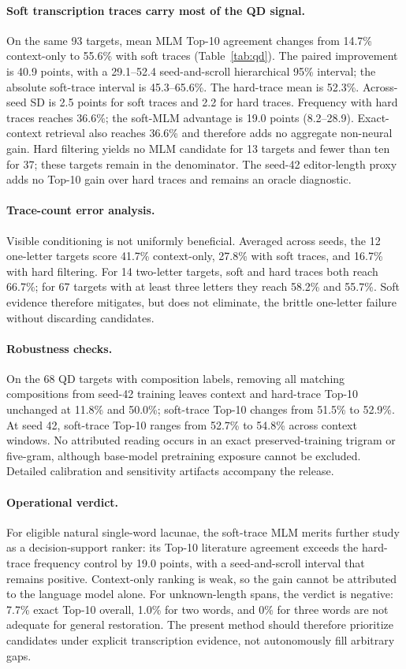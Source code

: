 \documentclass[10pt,twocolumn,a4paper]{article}
\begin{document}
\paragraph{Soft transcription traces carry most of the QD signal.}
On the same 93 targets, mean MLM Top-10 agreement changes from 14.7\% context-only to 55.6\% with soft traces (Table~\ref{tab:qd}). The paired improvement is 40.9 points, with a 29.1--52.4 seed-and-scroll hierarchical 95\% interval; the absolute soft-trace interval is 45.3--65.6\%. The hard-trace mean is 52.3\%. Across-seed SD is 2.5 points for soft traces and 2.2 for hard traces. Frequency with hard traces reaches 36.6\%; the soft-MLM advantage is 19.0 points (8.2--28.9). Exact-context retrieval also reaches 36.6\% and therefore adds no aggregate non-neural gain. Hard filtering yields no MLM candidate for 13 targets and fewer than ten for 37; these targets remain in the denominator. The seed-42 editor-length proxy adds no Top-10 gain over hard traces and remains an oracle diagnostic.

\paragraph{Trace-count error analysis.}
Visible conditioning is not uniformly beneficial. Averaged across seeds, the 12 one-letter targets score 41.7\% context-only, 27.8\% with soft traces, and 16.7\% with hard filtering. For 14 two-letter targets, soft and hard traces both reach 66.7\%; for 67 targets with at least three letters they reach 58.2\% and 55.7\%. Soft evidence therefore mitigates, but does not eliminate, the brittle one-letter failure without discarding candidates.

\paragraph{Robustness checks.}
On the 68 QD targets with composition labels, removing all matching compositions from seed-42 training leaves context and hard-trace Top-10 unchanged at 11.8\% and 50.0\%; soft-trace Top-10 changes from 51.5\% to 52.9\%. At seed 42, soft-trace Top-10 ranges from 52.7\% to 54.8\% across context windows. No attributed reading occurs in an exact preserved-training trigram or five-gram, although base-model pretraining exposure cannot be excluded. Detailed calibration and sensitivity artifacts accompany the release.

\paragraph{Operational verdict.}
For eligible natural single-word lacunae, the soft-trace MLM merits further study as a decision-support ranker: its Top-10 literature agreement exceeds the hard-trace frequency control by 19.0 points, with a seed-and-scroll interval that remains positive. Context-only ranking is weak, so the gain cannot be attributed to the language model alone. For unknown-length spans, the verdict is negative: 7.7\% exact Top-10 overall, 1.0\% for two words, and 0\% for three words are not adequate for general restoration. The present method should therefore prioritize candidates under explicit transcription evidence, not autonomously fill arbitrary gaps.
\end{document}
